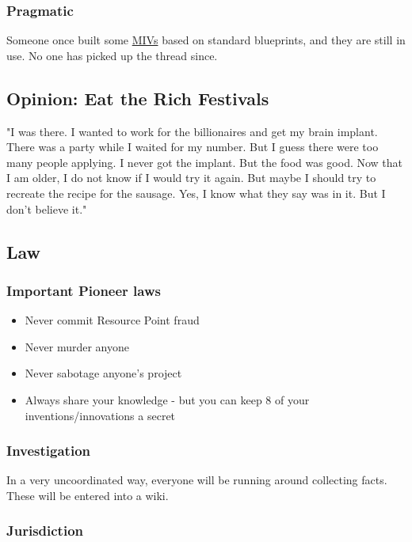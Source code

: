 \subsubsection{Pragmatic}

Someone once built some \hyperref[sec:MIV]{MIVs} based on standard blueprints, and they are still in use. No one has picked up the thread since.

\subsection{Opinion: Eat the Rich Festivals}

"I was there. I wanted to work for the billionaires and get my brain implant. There was a party while I waited for my number. But I guess there were too many people applying. I never got the implant. But the food was good. Now that I am older, I do not know if I would try it again. But maybe I should try to recreate the recipe for the sausage. Yes, I know what they say was in it. But I don't believe it."

\subsection{Law}
\label{sec: pioneer law}

\subsubsection{Important Pioneer laws}

\begin{itemize}
\item{Never commit Resource Point fraud}
\item{Never murder anyone}
\item{Never sabotage anyone's project}
\item{Always share your knowledge - but you can keep 8 of your inventions/innovations a secret}   %
\end{itemize}

\subsubsection{Investigation}

In a very uncoordinated way, everyone will be running around collecting facts. These will be entered into a wiki.

\subsubsection{Jurisdiction}


